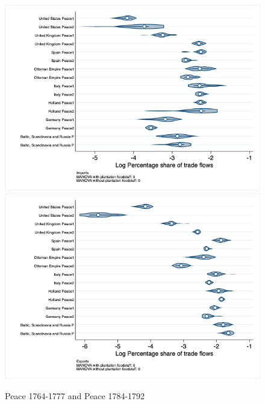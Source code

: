 \documentclass[12pt,a4paper,notitlepage,english]{article}
\begin{document}
\begin{figure}
\centering
\caption{Peace 1764-1777 and Peace 1784-1792}
\label{seven_peace1764_1777_nat_distr_pays7}
\includegraphics[scale=.4]{peace1764_1777_peace1784_1792_nat_distr_Ipays7}
\includegraphics[scale=.4]{peace1764_1777_peace1784_1792_nat_distr_Xpays7}
\end{figure}
\end{document}
